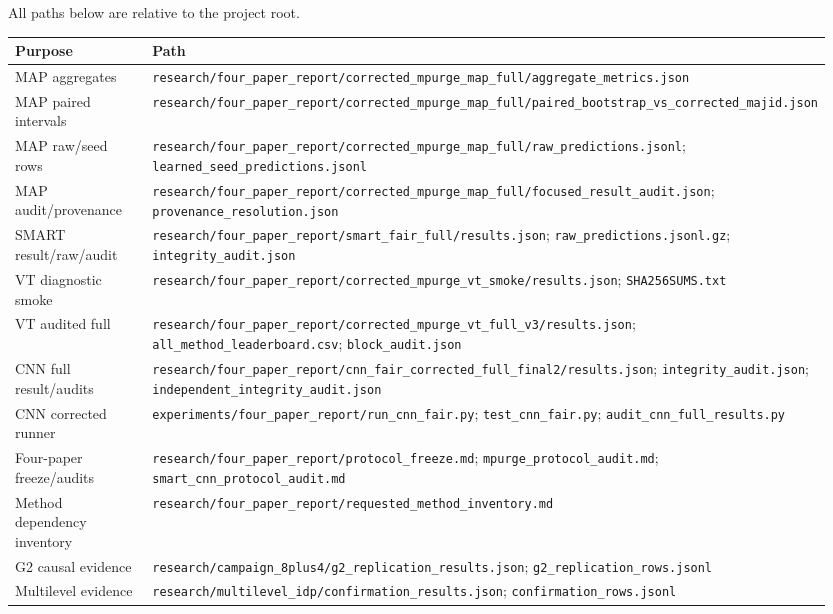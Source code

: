 \documentclass[10pt]{article}
\newcommand{\code}[1]{\nolinkurl{#1}}
\begin{document}
All paths below are relative to the project root.
\footnotesize
\begin{longtable}{@{}p{0.27\linewidth}p{0.68\linewidth}@{}}
\toprule Purpose & Path\\\midrule
MAP aggregates & \code{research/four_paper_report/corrected_mpurge_map_full/aggregate_metrics.json}\\
MAP paired intervals & \code{research/four_paper_report/corrected_mpurge_map_full/paired_bootstrap_vs_corrected_majid.json}\\
MAP raw/seed rows & \code{research/four_paper_report/corrected_mpurge_map_full/raw_predictions.jsonl}; \code{learned_seed_predictions.jsonl}\\
MAP audit/provenance & \code{research/four_paper_report/corrected_mpurge_map_full/focused_result_audit.json}; \code{provenance_resolution.json}\\
SMART result/raw/audit & \code{research/four_paper_report/smart_fair_full/results.json}; \code{raw_predictions.jsonl.gz}; \code{integrity_audit.json}\\
VT diagnostic smoke & \code{research/four_paper_report/corrected_mpurge_vt_smoke/results.json}; \code{SHA256SUMS.txt}\\
VT audited full & \code{research/four_paper_report/corrected_mpurge_vt_full_v3/results.json}; \code{all_method_leaderboard.csv}; \code{block_audit.json}\\
CNN full result/audits & \code{research/four_paper_report/cnn_fair_corrected_full_final2/results.json}; \code{integrity_audit.json}; \code{independent_integrity_audit.json}\\
CNN corrected runner & \code{experiments/four_paper_report/run_cnn_fair.py}; \code{test_cnn_fair.py}; \code{audit_cnn_full_results.py}\\
Four-paper freeze/audits & \code{research/four_paper_report/protocol_freeze.md}; \code{mpurge_protocol_audit.md}; \code{smart_cnn_protocol_audit.md}\\
Method dependency inventory & \code{research/four_paper_report/requested_method_inventory.md}\\
G2 causal evidence & \code{research/campaign_8plus4/g2_replication_results.json}; \code{g2_replication_rows.jsonl}\\
Multilevel evidence & \code{research/multilevel_idp/confirmation_results.json}; \code{confirmation_rows.jsonl}\\
\bottomrule
\end{longtable}
\normalsize
\end{document}
